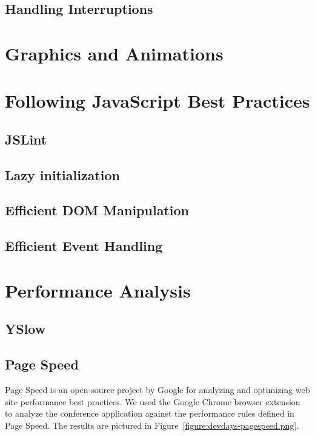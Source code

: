 \subsection{Handling Interruptions}



\section{Graphics and Animations}
\label{section:graphics}

\section{Following JavaScript Best Practices}
\label{section:js-best-practices}

\subsection{JSLint}
\subsection{Lazy initialization}
\subsection{Efficient DOM Manipulation}
\subsection{Efficient Event Handling}

\section{Performance Analysis}
\label{section:performance-analysis}

\subsection{YSlow}
\subsection{Page Speed}

Page Speed \citationneeded is an open-source project by Google for
analyzing and optimizing web site performance best practices. We used
the Google Chrome browser extension to analyze the conference
application against the performance rules defined in Page Speed. The
results are pictured in Figure~\ref{figure:devdays-pagespeed.png}.

